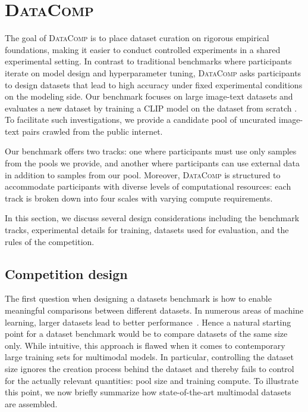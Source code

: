 \documentclass[dvipsnames,11pt]{article}
\newcommand{\datanet}{\textsc{DataComp}\xspace}
\newcommand{\users}{participants\xspace}
\begin{document}
\section{\datanet}
\label{sec:thecomp}

The goal of \datanet is to place dataset curation on rigorous empirical foundations, making it easier to conduct controlled experiments in a shared experimental setting.
In contrast to traditional benchmarks where participants iterate on model design and hyperparameter tuning, \datanet asks participants to design datasets that lead to high accuracy under fixed experimental conditions on the modeling side.
Our benchmark focuses on large image-text datasets and evaluates a new dataset by training a CLIP model on the dataset from scratch \cite{radford2021learning}. 
To facilitate such investigations, we provide a candidate pool of uncurated image-text pairs crawled from the public internet.

Our benchmark offers two tracks: one where \users must use only samples from the pools we provide, and another where \users can use external data in addition to samples from our pool.
Moreover, \datanet is structured to accommodate \users with diverse levels of computational resources: each track is broken down into four scales with varying compute requirements.

In this section, we discuss several design considerations including the benchmark tracks, experimental details for training, datasets used for evaluation, and the rules of the competition.


\subsection{Competition design}
The first question when designing a datasets benchmark is how to enable meaningful comparisons between different datasets.
In numerous areas of machine learning, larger datasets lead to better performance~\cite{krizhevsky2012imagenet,kaplan2020scaling,jia2021scaling,pham2021scaling,chinchilla,cherti2022reproducible,gpt3,radford2021learning,radford2022robust}.
Hence a natural starting point for a dataset benchmark would be to compare datasets of the same size only.
While intuitive, this approach is flawed when it comes to contemporary large training sets for multimodal models.
In particular, controlling the dataset size ignores the creation process behind the dataset and thereby fails to control for the actually relevant quantities: pool size and training compute.
To illustrate this point, we now briefly summarize how state-of-the-art multimodal datasets are assembled.
\end{document}
